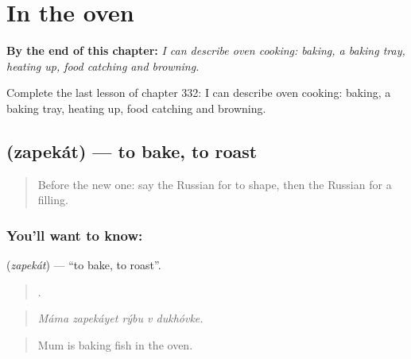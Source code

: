 
\chapter{In the oven}
\label{ch:ru-in-the-oven}

\begin{chapteropening}
\textbf{By the end of this chapter:} \emph{I can describe oven cooking: baking, a baking tray, heating up, food catching and browning.}

Complete the last lesson of chapter 332: I can describe oven cooking: baking, a baking tray, heating up, food catching and browning.
\end{chapteropening}

\section[\texorpdfstring{\ru{запекать} (zapekát)}{запекать (zapekát)}]{ (zapekát) — to bake, to roast}

\label{lesson:RU-C332-zapekat}



\begin{quote}
Before the new one: say the Russian for to shape, then the Russian for a filling.
\end{quote}

\subsection*{You'll want to know: }
\textbf{} (\emph{zapekát}) — \textquotedblleft{}to bake, to roast\textquotedblright{}.

\begin{quote}
    .
\end{quote}

\begin{quote}
\emph{Máma zapekáyet rýbu v dukhóvke.}
\end{quote}

\begin{quote}
Mum is baking fish in the oven.
\end{quote}

